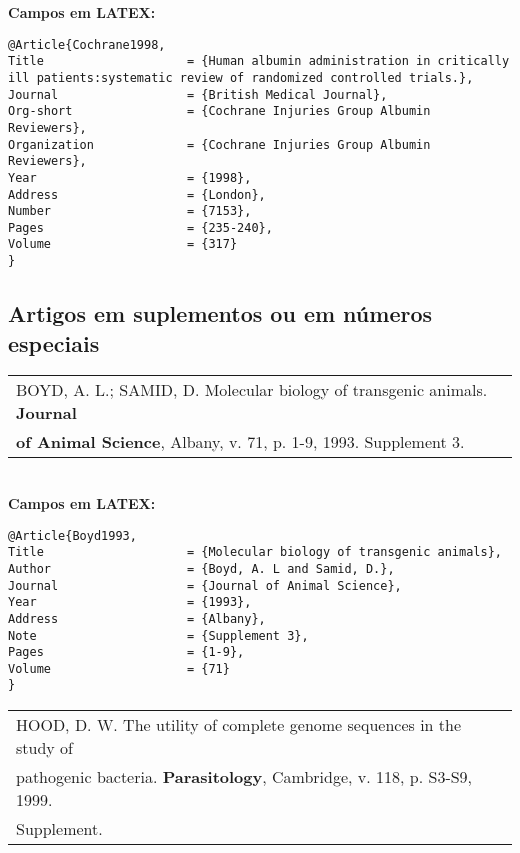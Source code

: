 \textbf{Campos em LATEX:} 
	
\begingroup
\fontsize{10pt}{12pt}\selectfont
\begin{verbatim}
@Article{Cochrane1998,
Title                    = {Human albumin administration in critically 
ill patients:systematic review of randomized controlled trials.},
Journal                  = {British Medical Journal},
Org-short                = {Cochrane Injuries Group Albumin Reviewers},
Organization             = {Cochrane Injuries Group Albumin Reviewers},
Year                     = {1998},
Address                  = {London},
Number                   = {7153},
Pages                    = {235-240},
Volume                   = {317}
}
\end{verbatim}
\endgroup
	
\subsection{Artigos em suplementos ou em números especiais}
	
\begin{tabular}{|l|c|} \hline
	BOYD, A. L.; SAMID, D. Molecular biology of transgenic animals. \textbf{Journal } \\ \textbf{of Animal Science}, Albany, v. 71, p. 1-9, 1993. Supplement 3. 
	                                                                                  \\\hline
\end{tabular} \\
	
\textbf{Campos em LATEX:} 
	
\begingroup
\fontsize{10pt}{12pt}\selectfont
\begin{verbatim}
@Article{Boyd1993,
Title                    = {Molecular biology of transgenic animals},
Author                   = {Boyd, A. L and Samid, D.},
Journal                  = {Journal of Animal Science},
Year                     = {1993},
Address                  = {Albany},
Note                     = {Supplement 3},
Pages                    = {1-9},
Volume                   = {71}
}
\end{verbatim}
\endgroup
	
\begin{tabular}{|l|c|} \hline
	HOOD, D. W. The utility of complete genome sequences in the study of \\pathogenic bacteria. \textbf{Parasitology}, Cambridge, v. 118, p. S3-S9, 1999. \\Supplement. \\\hline
\end{tabular} \\
	
